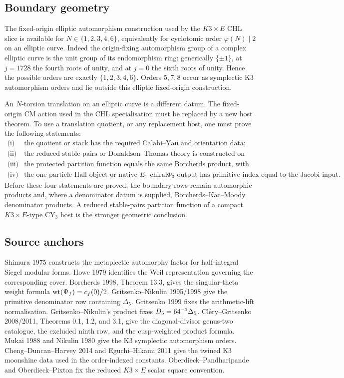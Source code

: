\subsection*{Boundary geometry}

The fixed-origin elliptic automorphism construction used by the
$K3\times E$ CHL slice is available for
$N\in\{1,2,3,4,6\}$, equivalently for cyclotomic order
$\varphi(N)\mid 2$ on an elliptic curve.  Indeed the origin-fixing
automorphism group of a complex elliptic curve is the unit group of
its endomorphism ring: generically $\{\pm1\}$, at $j=1728$ the fourth
roots of unity, and at $j=0$ the sixth roots of unity.  Hence the
possible orders are exactly $\{1,2,3,4,6\}$.  Orders $5,7,8$ occur as
symplectic K3 automorphism orders and lie outside this elliptic
fixed-origin construction.

An $N$-torsion translation on an elliptic curve is a different datum.
The fixed-origin CM action used in the CHL specialisation must be
replaced by a new host theorem.  To use a translation quotient, or any
replacement host, one must prove the following statements:
\[
\begin{array}{ll}
\text{(i)}&\text{the quotient or stack has the required Calabi--Yau and
orientation data;}\\
\text{(ii)}&\text{the reduced stable-pairs or Donaldson--Thomas theory is
constructed on that host;}\\
\text{(iii)}&\text{the protected partition function equals the same
Borcherds product, with variables and chamber fixed;}\\
\text{(iv)}&\text{the one-particle Hall object or native }E_1\text{-chiral
}\Phi_3\text{ output has primitive index equal to the Jacobi input.}
\end{array}
\]
Before these four statements are proved, the boundary rows remain
automorphic products and, where a denominator datum is supplied,
Borcherds--Kac--Moody denominator products.  A reduced stable-pairs
partition function of a compact $K3\times E$-type CY$_3$ host is the
stronger geometric conclusion.

\subsection*{Source anchors}

Shimura 1975 constructs the metaplectic automorphy factor for
half-integral Siegel modular forms.  Howe 1979 identifies the Weil
representation governing the corresponding cover.  Borcherds 1998,
Theorem 13.3, gives the singular-theta weight formula
$\mathrm{wt}(\Psi_f)=c_f(0)/2$.  Gritsenko--Nikulin 1995/1998 give the
primitive denominator row containing $\Delta_5$.  Gritsenko 1999 fixes
the arithmetic-lift normalisation.  Gritsenko--Nikulin's product fixes
$D_5=64^{-1}\Delta_5$.  Cl\'ery--Gritsenko 2008/2011, Theorems
0.1, 1.2, and 3.1, give the diagonal-divisor genus-two catalogue, the
excluded ninth row, and the cusp-weighted product formula.  Mukai 1988
and Nikulin 1980 give the K3 symplectic automorphism orders.
Cheng--Duncan--Harvey 2014 and Eguchi--Hikami 2011 give the twined K3
moonshine data used in the order-indexed constants.
Oberdieck--Pandharipande and Oberdieck--Pixton fix the reduced
$K3\times E$ scalar square convention.
